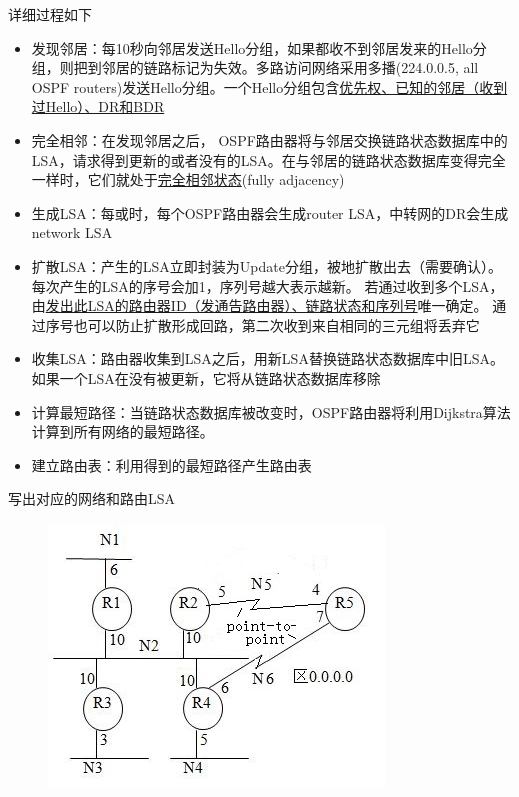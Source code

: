 详细过程如下
\begin{itemize}
	\item 发现邻居：每10秒向邻居发送Hello分组，如果都收不到邻居发来的Hello分组，则把到邻居的链路标记为失效。多路访问网络采用多播(224.0.0.5, all OSPF routers)发送Hello分组。一个Hello分组包含\underline{优先权、已知的邻居（收到过Hello）、DR和BDR}
	\item 完全相邻：在发现邻居之后， OSPF路由器将与邻居交换链路状态数据库中的LSA，请求得到更新的或者没有的LSA。在与邻居的链路状态数据库变得完全一样时，它们就处于\underline{完全相邻状态}(fully adjacency)
	\item 生成LSA：每或时，每个OSPF路由器会生成router LSA，中转网的DR会生成network LSA
	\item 扩散LSA：产生的LSA立即封装为Update分组，被地扩散出去（需要确认）。
	每次产生的LSA的序号会加1，序列号越大表示越新。
	若通过收到多个LSA，由\underline{发出此LSA的路由器ID（发通告路由器）、链路状态和序列号}唯一确定。
	通过序号也可以防止扩散形成回路，第二次收到来自相同的三元组将丢弃它
	\item 收集LSA：路由器收集到LSA之后，用新LSA替换链路状态数据库中旧LSA。
	如果一个LSA在没有被更新，它将从链路状态数据库移除
	\item 计算最短路径：当链路状态数据库被改变时，OSPF路由器将利用Dijkstra算法计算到所有网络的最短路径。
	\item 建立路由表：利用得到的最短路径产生路由表
\end{itemize}
\begin{example}
	写出对应的网络和路由LSA
	\begin{figure}[H]
		\centering
		\includegraphics[width=0.4\linewidth]{fig/ospf_example.jpg}
	\end{figure}
\end{example}

